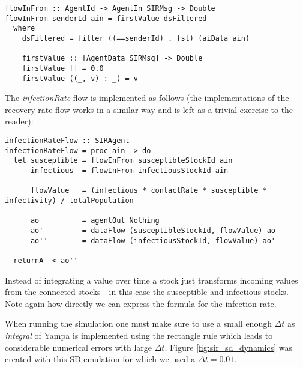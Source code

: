 \begin{verbatim}
flowInFrom :: AgentId -> AgentIn SIRMsg -> Double
flowInFrom senderId ain = firstValue dsFiltered
  where 
    dsFiltered = filter ((==senderId) . fst) (aiData ain)

    firstValue :: [AgentData SIRMsg] -> Double
    firstValue [] = 0.0
    firstValue ((_, v) : _) = v
\end{verbatim}
	
The \textit{infectionRate} flow is implemented as follows (the implementations of the recovery-rate flow works in a similar way and is left as a trivial exercise to the reader):

\begin{verbatim}
infectionRateFlow :: SIRAgent
infectionRateFlow = proc ain -> do
  let susceptible = flowInFrom susceptibleStockId ain 
      infectious  = flowInFrom infectiousStockId ain

      flowValue   = (infectious * contactRate * susceptible * infectivity) / totalPopulation
  
      ao          = agentOut Nothing
      ao'         = dataFlow (susceptibleStockId, flowValue) ao
      ao''        = dataFlow (infectiousStockId, flowValue) ao'
      
  returnA -< ao''
\end{verbatim}

Instead of integrating a value over time a stock just transforms incoming values from the connected stocks - in this case the susceptible and infectious stocks. Note again how directly we can express the formula for the infection rate.

When running the simulation one must make sure to use a small enough $\Delta t$ as \textit{integral} of Yampa is implemented using the rectangle rule which leads to considerable numerical errors with large $\Delta t$. Figure \ref{fig:sir_sd_dynamics} was created with this SD emulation for which we used a $\Delta t = 0.01$.

